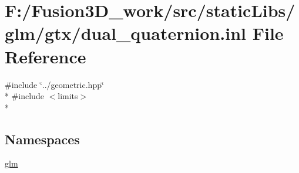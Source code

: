 \hypertarget{dual__quaternion_8inl}{}\section{F\+:/\+Fusion3\+D\+\_\+work/src/static\+Libs/glm/gtx/dual\+\_\+quaternion.inl File Reference}
\label{dual__quaternion_8inl}
{\ttfamily \#include \char`\"{}../geometric.\+hpp\char`\"{}}\\*
{\ttfamily \#include $<$limits$>$}\\*
\subsection*{Namespaces}
\begin{DoxyCompactItemize}
\item 
 \hyperlink{namespaceglm}{glm}
\end{DoxyCompactItemize}
